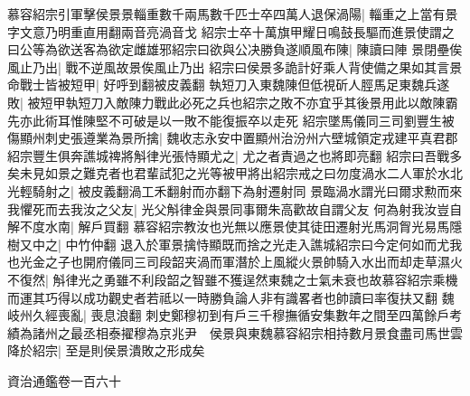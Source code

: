 慕容紹宗引軍擊侯景景輜重數千兩馬數千匹士卒四萬人退保渦陽|{
	輜重之上當有景字文意乃明重直用翻兩音亮渦音戈}
紹宗士卒十萬旗甲耀日鳴鼓長驅而進景使謂之曰公等為欲送客為欲定雌雄邪紹宗曰欲與公决勝負遂順風布陳|{
	陳讀曰陣}
景閉壘俟風止乃出|{
	戰不逆風故景俟風止乃出}
紹宗曰侯景多詭計好乘人背使備之果如其言景命戰士皆被短甲|{
	好呼到翻被皮義翻}
執短刀入東魏陳但低視斫人脛馬足東魏兵遂敗|{
	被短甲執短刀入敵陳力戰此必死之兵也紹宗之敗不亦宜乎其後景用此以敵陳霸先亦此術耳惟陳堅不可破是以一敗不能復振卒以走死}
紹宗墜馬儀同三司劉豐生被傷顯州刺史張遵業為景所擒|{
	魏收志永安中置顯州治汾州六壁城領定戎建平真君郡}
紹宗豐生俱奔譙城禆將斛律光張恃顯尤之|{
	尤之者責過之也將即亮翻}
紹宗曰吾戰多矣未見如景之難克者也君輩試犯之光等被甲將出紹宗戒之曰勿度渦水二人軍於水北光輕騎射之|{
	被皮義翻渦工禾翻射而亦翻下為射遷射同}
景臨渦水謂光曰爾求勲而來我懼死而去我汝之父友|{
	光父斛律金與景同事爾朱高歡故自謂父友}
何為射我汝豈自解不度水南|{
	解戶買翻}
慕容紹宗教汝也光無以應景使其徒田遷射光馬洞胷光易馬隱樹又中之|{
	中竹仲翻}
退入於軍景擒恃顯既而捨之光走入譙城紹宗曰今定何如而尤我也光金之子也開府儀同三司段韶夹渦而軍潛於上風縱火景帥騎入水出而却走草濕火不復然|{
	斛律光之勇雖不利段韶之智雖不獲逞然東魏之士氣未衰也故慕容紹宗乘機而運其巧得以成功觀史者若祗以一時勝負論人非有識畧者也帥讀曰率復扶又翻}
魏岐州久經喪亂|{
	喪息浪翻}
刺史鄭穆初到有戶三千穆撫循安集數年之間至四萬餘戶考績為諸州之最丞相泰擢穆為京兆尹　侯景與東魏慕容紹宗相持數月景食盡司馬世雲降於紹宗|{
	至是則侯景潰敗之形成矣}


資治通鑑卷一百六十
